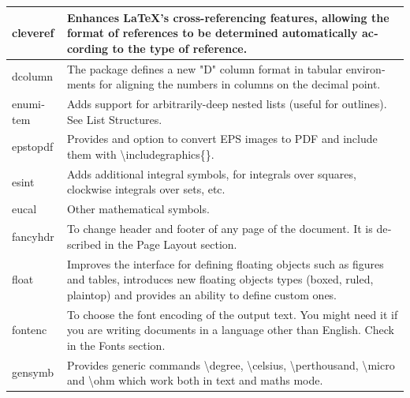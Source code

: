\begin{latin}
\begin{longtable}{| p{} | p{} |}
cleveref &En­hances LaTeX's cross-ref­er­enc­ing fea­tures, al­low­ing the for­mat of ref­er­ences to be de­ter­mined au­to­mat­i­cally ac­cord­ing to
the type of ref­er­ence.\\\hline
dcolumn &The package defines a new "D" column format in tab­u­lar en­vi­ron­ments for aligning the numbers in columns on the decimal point.\\\hline
enumitem &Adds support for arbitrarily-deep nested lists (useful for outlines). See List Structures.\\\hline
epstopdf &Provides and option to convert EPS images to PDF and include them with \textbackslash{includegraphics}\{\}.\\\hline
esint &Adds additional integral symbols, for integrals over squares, clockwise integrals over sets, etc.\\\hline
eucal &Other mathematical symbols.\\\hline
fancyhdr &To change header and footer of any page of the document. It is described in the Page Layout section.\\\hline
float &Im­proves the in­ter­face for defin­ing float­ing ob­jects such as fig­ures and ta­bles, introduces new floating objects types (boxed, ruled, plaintop) and provides an ability to define custom ones.\\\hline
fontenc &To choose the font encoding of the output text. You might need it if you are writing documents in a language other than English. Check in the Fonts section.\\\hline
gensymb &Pro­vides generic com­mands \textbackslash{de­gree}, \textbackslash{cel­sius}, \textbackslash{pert­hou­sand}, \textbackslash{mi­cro} and \textbackslash{ohm} which work both in text and maths mode.\\\hline

\end{longtable}
\end{latin}
